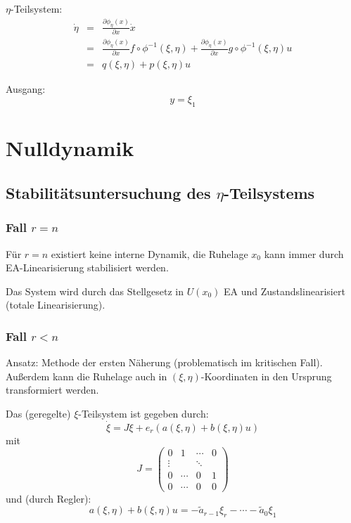 $\eta$-Teilsystem:
\begin{eqnarray}
    \dot{\eta} &=& \frac{\partial \phi_\eta(x)}{\partial x} \dot{x} \\
        &=& \frac{\partial \phi_\eta(x)}{\partial x} f \circ \phi^{-1}(\xi, \eta) +
        \frac{\partial \phi_\eta(x)}{\partial x} g \circ \phi^{-1}(\xi, \eta) u \\
        &=& q(\xi, \eta) + p(\xi, \eta) u
\end{eqnarray}

Ausgang:
\begin{equation}
    y = \xi_1
\end{equation}

\section{Nulldynamik}
\subsection{Stabilitätsuntersuchung des $\eta$-Teilsystems}
\subsubsection{Fall $r=n$}
Für $r=n$ existiert keine interne Dynamik, die Ruhelage $x_0$ kann immer durch EA-Linearisierung stabilisiert werden.

Das System wird durch das Stellgesetz in $U(x_0)$ EA und Zustandslinearisiert (totale Linearisierung).

\subsubsection{Fall $r < n$}
Ansatz: Methode der ersten Näherung (problematisch im kritischen Fall). Außerdem kann
die Ruhelage auch in $(\xi, \eta)$-Koordinaten in den Ursprung transformiert werden.

Das (geregelte) $\xi$-Teilsystem ist gegeben durch:
\begin{equation}
    \dot{\xi} = J \xi + e_r (a(\xi, \eta) + b(\xi, \eta) u)
\end{equation}
mit
\begin{equation}
    J =
    \begin{pmatrix}
        0 & 1 & \cdots & 0 \\
        \vdots & & \ddots & \\
        0 & \cdots & 0 & 1 \\
        0 & \cdots & 0 & 0
    \end{pmatrix}
\end{equation}
und (durch Regler):
\begin{equation}
    a(\xi, \eta) + b(\xi, \eta) u = - \tilde{a}_{r-1} \xi_r - \cdots - \tilde{a}_0 \xi_1
\end{equation}

